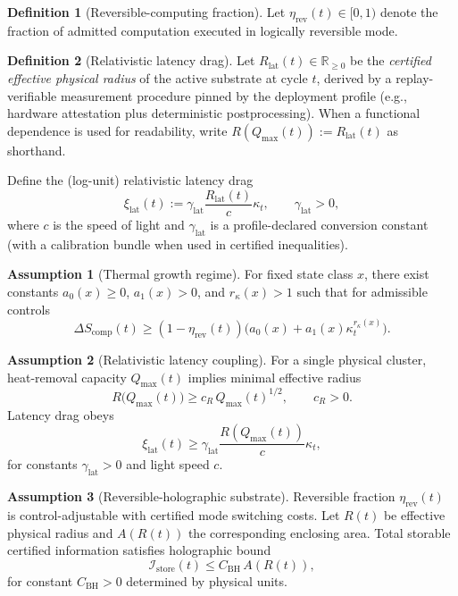 \documentclass[11pt,a4paper]{article}
\newcommand{\R}{\mathbb{R}}
\theoremstyle{definition}
\newtheorem{definition}{Definition}
\newtheorem{assumption}{Assumption}
\theoremstyle{remark}
\begin{document}
\begin{definition}[Reversible-computing fraction]\label{def:reversible_computing_fraction}
Let $\eta_{\mathrm{rev}}(t)\in[0,1)$ denote the fraction of admitted computation executed in logically reversible mode.
\end{definition}

\begin{definition}[Relativistic latency drag]\label{def:relativistic_latency_drag}
Let $R_{\mathrm{lat}}(t)\in\R_{\ge 0}$ be the \emph{certified effective physical radius} of the active substrate at cycle $t$, derived by a replay-verifiable measurement procedure pinned by the deployment profile (e.g., hardware attestation plus deterministic postprocessing).
When a functional dependence is used for readability, write $R(Q_{\max}(t)):=R_{\mathrm{lat}}(t)$ as shorthand.

Define the (log-unit) relativistic latency drag
\[
\xi_{\mathrm{lat}}(t):=\gamma_{\mathrm{lat}}\frac{R_{\mathrm{lat}}(t)}{c}\kappa_t,\qquad \gamma_{\mathrm{lat}}>0,
\]
where $c$ is the speed of light and $\gamma_{\mathrm{lat}}$ is a profile-declared conversion constant (with a calibration bundle when used in certified inequalities).
\end{definition}

\begin{assumption}[Thermal growth regime]\label{ass:thermal}
For fixed state class $x$, there exist constants $a_0(x)\ge 0$, $a_1(x)>0$, and $r_{\kappa}(x)>1$ such that for admissible controls
\[
\Delta S_{\mathrm{comp}}(t)\ge (1-\eta_{\mathrm{rev}}(t))\big(a_0(x)+a_1(x)\kappa_t^{r_{\kappa}(x)}\big).
\]
\end{assumption}

\begin{assumption}[Relativistic latency coupling]\label{ass:relativistic}
For a single physical cluster, heat-removal capacity $Q_{\max}(t)$ implies minimal effective radius
\[
R\!\big(Q_{\max}(t)\big)\ge c_R\,Q_{\max}(t)^{1/2},\qquad c_R>0.
\]
Latency drag obeys
\[
\xi_{\mathrm{lat}}(t)\ge \gamma_{\mathrm{lat}}\frac{R(Q_{\max}(t))}{c}\kappa_t,
\]
for constants $\gamma_{\mathrm{lat}}>0$ and light speed $c$.
\end{assumption}

\begin{assumption}[Reversible-holographic substrate]\label{ass:holo}
Reversible fraction $\eta_{\mathrm{rev}}(t)$ is control-adjustable with certified mode switching costs.
Let $R(t)$ be effective physical radius and $A(R(t))$ the corresponding enclosing area.
Total storable certified information satisfies holographic bound
\[
\mathcal I_{\mathrm{store}}(t)\le C_{\mathrm{BH}}\,A(R(t)),
\]
for constant $C_{\mathrm{BH}}>0$ determined by physical units.
\end{assumption}
\end{document}

